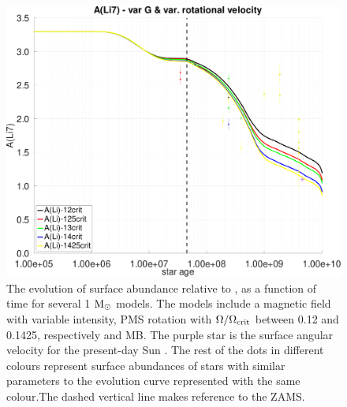 \documentclass[fleqn,usenatbib]{mnras}
\begin{document}
\begin{figure}
	\includegraphics[clip,width=\columnwidth]{figures/paper2/li_var_vel_var_g_3.pdf}
    \caption{The evolution of surface  abundance relative to , as a function of time for several 1 $\mathrm{M}_\odot$ models. The models include a magnetic field with variable intensity, PMS rotation with $\Omega / \Omega_{\mathrm{crit}}$ between 0.12 and 0.1425, respectively and MB. The purple star is the surface angular velocity for the present-day Sun \citep{Gill2012}. The rest of the dots in different colours represent surface  abundances of stars with similar parameters to the evolution curve represented with the same colour.The dashed vertical line makes reference to the ZAMS.}
    \label{fig:li_var_vel_var_g_3}
\end{figure}
\end{document}
